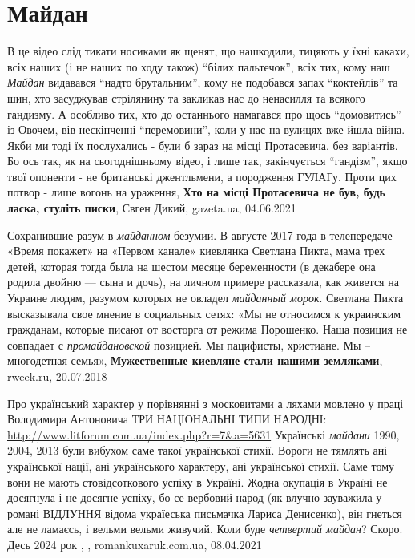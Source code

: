  
 
 
 
 
\chapter{Майдан}
\label{sec:slova.maidan}

В це відео слід тикати носиками як щенят, що нашкодили, тицяють у їхні какахи,
всіх наших (і не наших по ходу також) \enquote{білих пальтечок}, всіх тих, кому
наш \emph{Майдан} видавався \enquote{надто брутальним}, кому не подобався запах
\enquote{коктейлів} та шин, хто засуджував стрілянину та закликав нас до
ненасилля та всякого гандизму. А особливо тих, хто до останнього намагався про
щось \enquote{домовитись} із Овочем, вів нескінченні \enquote{перемовини}, коли
у нас на вулицях вже йшла війна.  Якби ми тоді їх послухались - були б зараз на
місці Протасевича, без варіантів.  Бо ось так, як на сьогоднішньому відео, і
лише так, закінчується \enquote{гандізм}, якщо твої опоненти - не британські
джентльмени, а породження ГУЛАГу. Проти цих потвор - лише вогонь на ураження,
\textbf{Хто на місці Протасевича не був, будь ласка, стуліть писки},
Євген Дикий, gazeta.ua, 04.06.2021

Сохранившие разум в \emph{майданном} безумии. В августе 2017 года в телепередаче
«Время покажет» на «Первом канале» киевлянка Светлана Пикта, мама трех детей,
которая тогда была на шестом месяце беременности (в декабере она родила двойню
— сына и дочь), на личном примере рассказала, как живется на Украине людям,
разумом которых не овладел \emph{майданный морок}. Светлана Пикта высказывала свое
мнение в социальных сетях: «Мы не относимся к украинским гражданам, которые
писают от восторга от режима Порошенко. Наша позиция не совпадает с
\emph{промайдановской} позицией. Мы пацифисты, христиане. Мы – многодетная семья»,
\textbf{Мужественные киевляне стали нашими земляками}, rweek.ru, 20.07.2018


Про український характер у порівнянні з московитами а ляхами мовлено у праці
Володимира Антоновича ТРИ НАЦІОНАЛЬНІ ТИПИ НАРОДНІ:
\url{http://www.litforum.com.ua/index.php?r=7&a=5631} Українські \emph{майдани}
1990, 2004, 2013 були вибухом саме такої української стихії.  Вороги не тямлять
ані української нації, ані українського характеру, ані української стихії. Саме
тому вони не мають стовідсоткового успіху в Україні.  Жодна окупація в Україні
не досягнула і не досягне успіху, бо се вербовий народ (як влучно зауважила у
романі ВІДЛУННЯ відома україеська письмачка Лариса Денисенко), він гнеться але
не ламаєсь, і вельми вельми живучий.  Коли буде \emph{четвертий майдан}?
Скоро.  Десь 2024 рок
, 
, romankuxaruk.com.ua, 08.04.2021

